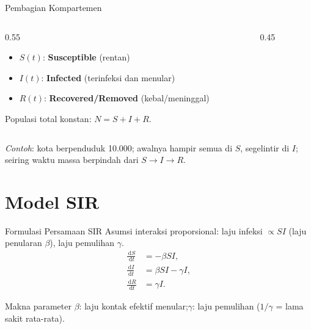 \documentclass[aspectratio=32]{beamer}
\newcommand{\jsg}[1]{\textcolor{teal!60!black}{\textbf{#1}}}
\newcommand{\dd}{\,\mathrm d}
\begin{document}
\begin{frame}{Pembagian Kompartemen}
\begin{columns}[T,totalwidth=\textwidth]
  \begin{column}{0.55\textwidth}
    \begin{itemize}
      \item $S(t)$: \jsg{Susceptible} (rentan)
      \item $I(t)$: \jsg{Infected} (terinfeksi dan menular)
      \item $R(t)$: \jsg{Recovered/Removed} (kebal/meninggal)
    \end{itemize}
    Populasi total konstan: $N=S+I+R$.
  \end{column}
  \begin{column}{0.45\textwidth}
    \centering
    
  \end{column}
\end{columns}

\vspace{1em}

\vspace{0.5em}

\small \textit{Contoh}: kota berpenduduk 10.000; awalnya hampir semua di $S$, segelintir di $I$; seiring waktu massa berpindah dari $S\to I\to R$.
\end{frame}

\section{Model SIR}

\begin{frame}{Formulasi Persamaan SIR}
Asumsi interaksi proporsional: laju infeksi $\propto SI$ (laju penularan $\beta$), laju pemulihan $\gamma$.
\begin{align*}
\frac{\dd S}{\dd t} &= -\beta SI, \\
\frac{\dd I}{\dd t} &= \beta SI - \gamma I, \\
\frac{\dd R}{\dd t} &= \gamma I.
\end{align*}
\begin{block}{Makna parameter}
$\beta$: laju kontak efektif menular;\quad $\gamma$: laju pemulihan ($1/\gamma$ = lama sakit rata-rata).
\end{block}
\end{frame}
\end{document}
